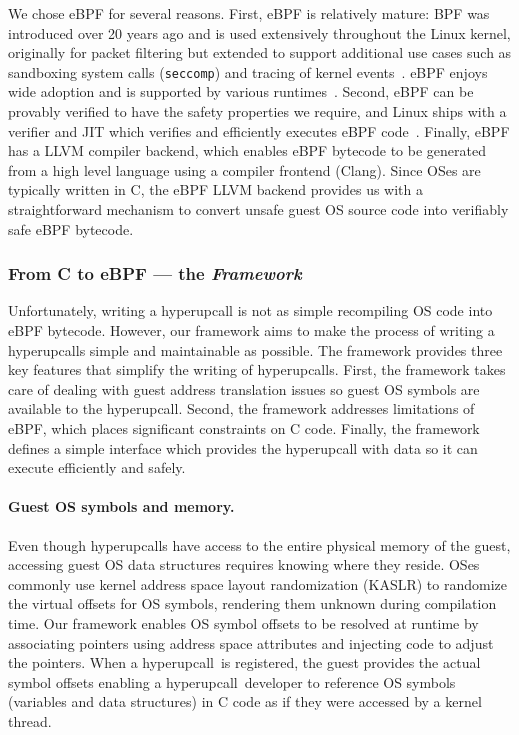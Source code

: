\documentclass[11pt]{article}
\newcommand{\hypercallback}{hyperupcall\xspace{}}
\begin{document}
We chose eBPF for several reasons. First, eBPF is relatively mature: 
BPF was introduced over 20 years ago and is used extensively 
throughout the Linux kernel, originally for packet filtering but
extended to support additional use cases such as 
sandboxing system calls (\texttt{seccomp}) and tracing of kernel 
events~\cite{bcc}. eBPF enjoys wide adoption and is supported by various 
runtimes~\cite{bigswitch15ubpf,monnet17rbpf}.
Second, eBPF can be provably verified to have the safety properties we
require, and Linux ships with a verifier and JIT which verifies 
 and efficiently executes eBPF code~\cite{wang2014jitk}.
Finally, eBPF has a LLVM compiler backend, which enables eBPF bytecode 
to be generated from a high level language using a compiler frontend
(Clang). Since OSes are typically written in C, the eBPF LLVM backend 
provides us with a straightforward mechanism to convert unsafe guest OS source 
code into verifiably safe eBPF bytecode. 

\subsubsection{From C to eBPF --- the \emph{Framework}}

Unfortunately, writing a \hypercallback{} is not as simple recompiling
OS code into eBPF bytecode. However, our 
framework aims to make the process of writing a \hypercallback{s} simple and 
maintainable as possible. The framework provides three key features that simplify 
the writing of \hypercallback{s}. First, the framework takes care of dealing with 
guest address translation issues so guest OS symbols are available to the 
\hypercallback. Second, the framework addresses limitations of eBPF, 
which places significant constraints on C code. Finally, the framework 
defines a simple interface which provides the \hypercallback{} with data so 
it can execute efficiently and safely.

\paragraph{Guest OS symbols and memory.} Even though \hypercallback{}s have access 
to the entire physical memory of the guest, accessing guest OS data structures
 requires knowing where they reside.
OSes commonly use kernel address space layout randomization (KASLR) to randomize
the virtual offsets for OS symbols, 
rendering them unknown during compilation time. Our framework enables OS symbol 
offsets to be resolved at runtime by associating pointers %
using address space attributes and injecting code to adjust the pointers.
When a \hypercallback~is registered, the guest provides the actual symbol 
offsets enabling a \hypercallback~developer to reference OS symbols 
(variables and data structures) in C code as if they were accessed by a kernel thread.
\end{document}
